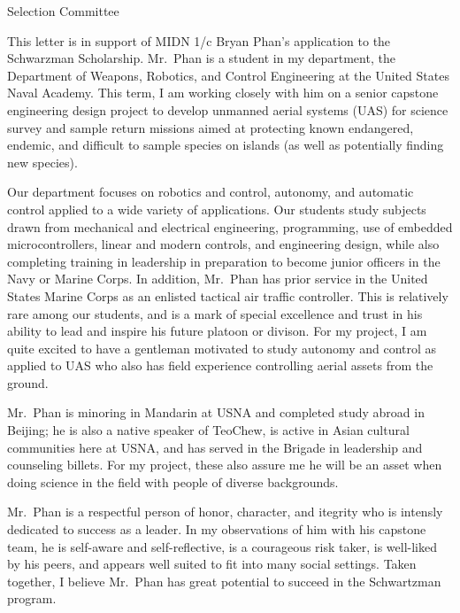 \documentclass[12pt]{wrceletter}
\date{\today}
\begin{document}
\begin{letter}{%
Selection Committee}

\opening{}
\raggedright 
\setlength{\parindent}{15pt}

This letter is in support of MIDN 1/c Bryan Phan's application to the Schwarzman Scholarship. Mr.~Phan is a student in my department, the Department of Weapons, Robotics, and Control Engineering at the United States Naval Academy. This term, I am working closely with him on a senior capstone engineering design project to develop unmanned aerial systems (UAS) for science survey and sample return missions aimed at protecting known endangered, endemic, and difficult to sample species on islands (as well as potentially finding new species). 
 
Our department focuses on robotics and control, autonomy, and automatic control applied to a wide variety of applications. Our students study subjects drawn from mechanical and electrical engineering, programming, use of embedded microcontrollers, linear and modern controls, and engineering design, while also completing training in leadership in preparation to become junior officers in the Navy or Marine Corps. In addition, Mr.~Phan has prior service in the United States Marine Corps as an enlisted tactical air traffic controller. This is relatively rare among our students, and is a mark of special excellence and trust in his ability to lead and inspire his future platoon or divison. For my project, I am quite excited to have a gentleman motivated to study autonomy and control as applied to UAS who also has field experience controlling aerial assets from the ground. 
 
Mr.~Phan is minoring in Mandarin at USNA and completed study abroad in Beijing; he is also a native speaker of TeoChew, is active in Asian cultural communities here at USNA, and has served in the Brigade in leadership and counseling billets. For my project, these also assure me he will be an asset when doing science in the field with people of diverse backgrounds. 

Mr.~Phan is a respectful person of honor, character, and itegrity who is intensly dedicated to success as a leader. In my observations of him with his capstone team, he is self-aware and self-reflective, is a courageous risk taker, is well-liked by his peers, and appears well suited to fit into many social settings. Taken together, I believe Mr.~Phan has great potential to succeed in the Schwartzman program. 

\closing{~} %

\end{letter}
\end{document}

